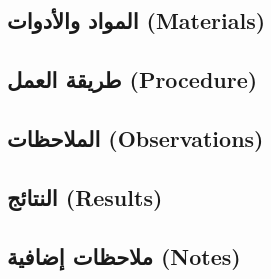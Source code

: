 \documentclass[11pt,a4paper]{article}
\begin{document}
\subsection*{المواد والأدوات (Materials)}

\subsection*{طريقة العمل (Procedure)}

\subsection*{الملاحظات (Observations)}

\subsection*{النتائج (Results)}

\subsection*{ملاحظات إضافية (Notes)}
\end{document}
